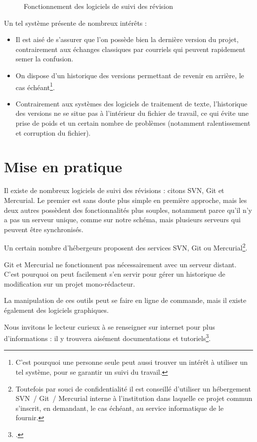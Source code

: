 \begin{figure}[ht]
\centering

\caption{Fonctionnement des logiciels de suivi des révision}\label{svn}
\end{figure}

Un tel système présente de nombreux intérêts :
\begin{itemize}
\item Il est aisé de s'assurer que l'on possède bien la dernière version du projet, contrairement aux échanges classiques par courriels qui peuvent rapidement semer la confusion.
\item On dispose d'un historique des versions permettant de revenir en arrière, le cas échéant\footnote{C'est pourquoi une personne seule peut aussi trouver un intérêt à utiliser un tel système, pour se garantir un suivi du travail.}.
\item Contrairement aux systèmes des logiciels de traitement de texte, l'historique des versions ne se situe pas à l'intérieur du fichier de travail, ce qui évite une prise de poids et un certain nombre de problèmes (notamment ralentissement et corruption du fichier).
\end{itemize}


\section{Mise en pratique}
Il existe de nombreux logiciels de suivi des révisions  : citons SVN, Git et Mercurial. Le premier est sans doute plus simple en première approche, mais les deux autres possèdent des fonctionnalités plus souples, notamment parce qu'il n'y a pas un serveur unique, comme sur notre schéma, mais plusieurs serveurs qui peuvent être synchronisés.

Un certain nombre d'hébergeurs proposent des services SVN, Git ou Mercurial\footnote{Toutefois par souci de confidentialité il est conseillé d'utiliser un hébergement SVN~/ Git~/ Mercurial interne à l'institution dans laquelle ce projet commun s'inscrit, en demandant, le cas échéant, au service informatique de le fournir.}. 

Git et Mercurial ne fonctionnent pas nécessairement avec un serveur distant. C'est pourquoi on peut facilement s'en servir pour gérer un historique de modification sur un projet mono-rédacteur.

La manipulation de ces outils peut se faire en ligne de commande, mais il existe également des logiciels graphiques.

Nous invitons le lecteur curieux à se renseigner sur internet pour plus d'informations : il y trouvera aisément documentations et tutoriels\footcites[Nous recommandons, pour Git, cet excellent livre :][]{progit}[pour notre part, nous avons écrit un petit tutoriel sur l'Utilisation de Git avec une seule personne :][]{git}.
